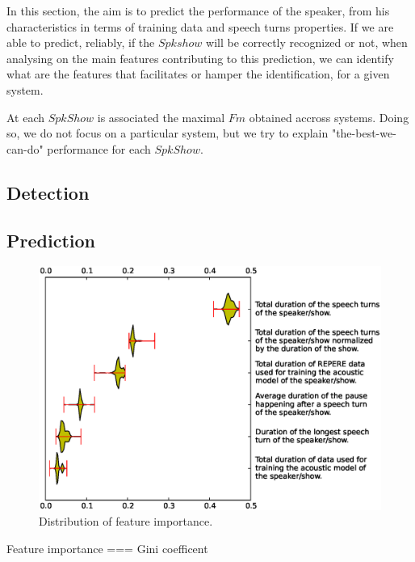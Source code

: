 In this section, the aim is to predict the performance of the speaker, from his characteristics in terms of training data and speech turns properties. If we are able to predict, reliably, if the $Spkshow$ will be correctly recognized or not, when analysing on the main features contributing to this prediction, we can identify what are the features that  facilitates or hamper the identification, for a given system.

At each $SpkShow$ is associated the maximal $Fm$ obtained accross systems. Doing so, we do not focus on a particular system, but we try to explain "the-best-we-can-do" performance for each $SpkShow$.

\subsection{Detection}


\subsection{Prediction}


\begin{figure}[t]
\centering
\includegraphics[width=\linewidth]{figures/violin.eps}
\caption{Distribution of feature importance.}
\label{fig:featureImportance}
\end{figure}


Feature importance === Gini coefficent~\cite{Breiman2001}